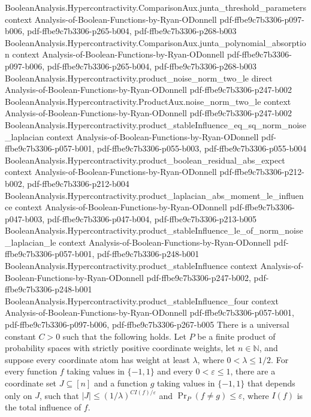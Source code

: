 \begin{theorem}
\proofstep
  {BooleanAnalysis.Hypercontractivity.ComparisonAux.junta_threshold_parameters}
  {context}
  {Analysis-of-Boolean-Functions-by-Ryan-ODonnell}
  {pdf-ffbe9c7b3306-p097-b006,
    pdf-ffbe9c7b3306-p265-b004,
    pdf-ffbe9c7b3306-p268-b003}
\proofstep
  {BooleanAnalysis.Hypercontractivity.ComparisonAux.junta_polynomial_absorption}
  {context}
  {Analysis-of-Boolean-Functions-by-Ryan-ODonnell}
  {pdf-ffbe9c7b3306-p097-b006,
    pdf-ffbe9c7b3306-p265-b004,
    pdf-ffbe9c7b3306-p268-b003}
\proofstep
  {BooleanAnalysis.Hypercontractivity.product_noise_norm_two_le}
  {direct}
  {Analysis-of-Boolean-Functions-by-Ryan-ODonnell}
  {pdf-ffbe9c7b3306-p247-b002}
\proofstep
  {BooleanAnalysis.Hypercontractivity.ProductAux.noise_norm_two_le}
  {context}
  {Analysis-of-Boolean-Functions-by-Ryan-ODonnell}
  {pdf-ffbe9c7b3306-p247-b002}
\proofstep
  {BooleanAnalysis.Hypercontractivity.product_stableInfluence_eq_sq_norm_noise_laplacian}
  {context}
  {Analysis-of-Boolean-Functions-by-Ryan-ODonnell}
  {pdf-ffbe9c7b3306-p057-b001,
    pdf-ffbe9c7b3306-p055-b003,
    pdf-ffbe9c7b3306-p055-b004}
\proofstep
  {BooleanAnalysis.Hypercontractivity.product_boolean_residual_abs_expect}
  {context}
  {Analysis-of-Boolean-Functions-by-Ryan-ODonnell}
  {pdf-ffbe9c7b3306-p212-b002,
    pdf-ffbe9c7b3306-p212-b004}
\proofstep
  {BooleanAnalysis.Hypercontractivity.product_laplacian_abs_moment_le_influence}
  {context}
  {Analysis-of-Boolean-Functions-by-Ryan-ODonnell}
  {pdf-ffbe9c7b3306-p047-b003,
    pdf-ffbe9c7b3306-p047-b004,
    pdf-ffbe9c7b3306-p213-b005}
\proofstep
  {BooleanAnalysis.Hypercontractivity.product_stableInfluence_le_of_norm_noise_laplacian_le}
  {context}
  {Analysis-of-Boolean-Functions-by-Ryan-ODonnell}
  {pdf-ffbe9c7b3306-p057-b001,
    pdf-ffbe9c7b3306-p248-b001}
\proofstep
  {BooleanAnalysis.Hypercontractivity.product_stableInfluence}
  {context}
  {Analysis-of-Boolean-Functions-by-Ryan-ODonnell}
  {pdf-ffbe9c7b3306-p247-b002,
    pdf-ffbe9c7b3306-p248-b001}
\proofstep
  {BooleanAnalysis.Hypercontractivity.product_stableInfluence_four}
  {context}
  {Analysis-of-Boolean-Functions-by-Ryan-ODonnell}
  {pdf-ffbe9c7b3306-p057-b001,
    pdf-ffbe9c7b3306-p097-b006,
    pdf-ffbe9c7b3306-p267-b005}
There is a universal constant $C>0$ such that the following holds. Let $P$ be a finite
product of probability spaces with strictly positive coordinate weights, let
$n\in\mathbb N$, and suppose every coordinate atom has weight at least $\lambda$, where
$0<\lambda\le 1/2$. For every function $f$ taking values in $\{-1,1\}$ and every
$0<\varepsilon\le1$, there are a coordinate set $J\subseteq[n]$ and a function $g$
taking values in $\{-1,1\}$ that depends only on $J$, such that $|J|\le(1/\lambda)^{C
I(f)/\varepsilon}$ and $\Pr_P(f\ne g)\le\varepsilon$, where $I(f)$ is the total
influence of $f$.
\end{theorem}

